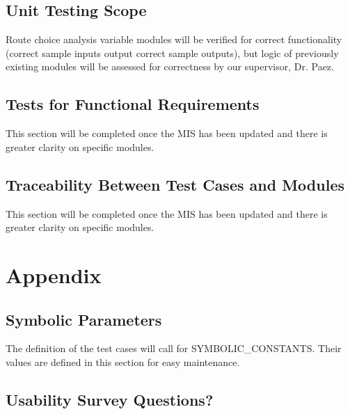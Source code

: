 \documentclass[12pt, titlepage]{article}
\begin{document}
\subsection{Unit Testing Scope}

Route choice analysis variable modules will be verified for correct functionality (correct sample inputs output correct sample outputs), but logic of previously existing modules will be assessed for correctness by our supervisor, Dr. Paez.

\subsection{Tests for Functional Requirements}

This section will be completed once the MIS has been updated and there is greater clarity on specific modules. 

\subsection{Traceability Between Test Cases and Modules}
This section will be completed once the MIS has been updated and there is greater clarity on specific modules. 
				




\newpage

\section{Appendix}

\subsection{Symbolic Parameters}

The definition of the test cases will call for SYMBOLIC\_CONSTANTS.
Their values are defined in this section for easy maintenance.

\subsection{Usability Survey Questions?}
\end{document}
